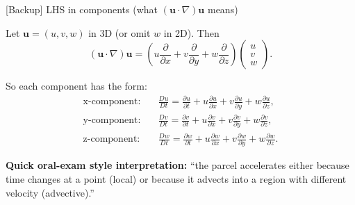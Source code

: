 \documentclass{beamer}
\begin{document}
\begin{frame}{[Backup] LHS in components (what $(\mathbf{u}\cdot\nabla)\mathbf{u}$ means)}
\footnotesize

Let $\mathbf{u}=(u,v,w)$ in 3D (or omit $w$ in 2D). Then
\[
(\mathbf{u}\cdot\nabla)\mathbf{u}
=
\left(u\frac{\partial}{\partial x}+v\frac{\partial}{\partial y}+w\frac{\partial}{\partial z}\right)
\begin{pmatrix}u\\v\\w\end{pmatrix}.
\]

\medskip
So each component has the form:
\[
\begin{aligned}
\text{x-component:}\quad
&\frac{Du}{Dt}=\frac{\partial u}{\partial t} + u\frac{\partial u}{\partial x}+v\frac{\partial u}{\partial y}+w\frac{\partial u}{\partial z},\\[3pt]
\text{y-component:}\quad
&\frac{Dv}{Dt}=\frac{\partial v}{\partial t} + u\frac{\partial v}{\partial x}+v\frac{\partial v}{\partial y}+w\frac{\partial v}{\partial z},\\[3pt]
\text{z-component:}\quad
&\frac{Dw}{Dt}=\frac{\partial w}{\partial t} + u\frac{\partial w}{\partial x}+v\frac{\partial w}{\partial y}+w\frac{\partial w}{\partial z}.
\end{aligned}
\]

\medskip
\textbf{Quick oral-exam style interpretation:}
``the parcel accelerates either because time changes at a point (local) or because it advects into a region
with different velocity (advective).''

\end{frame}
\end{document}
